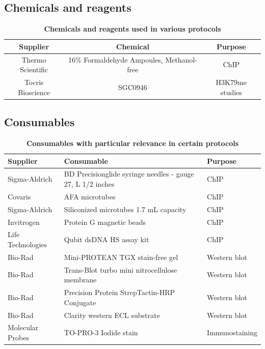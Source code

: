 \documentclass[11pt,twoside,a4paper]{report}
\begin{document}
		\subsection{Chemicals and reagents}
		
			\begin{table}[H]
       		\caption{\bf{Chemicals and reagents used in various protocols}}
        		\begin{center}
            		\begin{tabular}{c|c|c}
	               		Supplier & Chemical & Purpose\\
    		            \hline
    		            Thermo Scientific & 16\% Formaldehyde Ampoules, Methanol-free & ChIP\\
    		            Tocris Bioscience & SGC0946 & H3K79me studies\\
	            	\end{tabular}
    		    \end{center}
		    \end{table}
    
	    \subsection{Consumables}
	    \label{subsection:consumables}
			\begin{table}[H]
       			\caption{\bf{Consumables with particular relevance in certain protocols}}
        		\begin{center}
            		\begin{tabular}{p{2.9cm} | p{8.2cm} | p{2.2cm}}
	                	\textbf{Supplier} & \textbf{Consumable} &  \textbf{Purpose}\\
    		            \hline
    		            Sigma-Aldrich & BD Precisionglide syringe needles - gauge 27, L 1/2 inches & ChIP\\
    		            Covaris & AFA microtubes & ChIP\\
						Sigma-Aldrich & Siliconized microtubes 1.7 mL capacity & ChIP\\
        		        Invitrogen & Protein G magnetic beads & ChIP\\
        		        Life Technologies & Qubit dsDNA HS assay kit & ChIP\\
        		        Bio-Rad & Mini-PROTEAN TGX stain-free gel & Western blot\\
        		        Bio-Rad & Trans-Blot turbo mini nitrocellulose membrane & Western blot\\
						Bio-Rad & Precision Protein StrepTactin-HRP Conjugate & Western blot\\
        		        Bio-Rad & Clarity western ECL substrate & Western blot\\
        		        Molecular Probes & TO-PRO-3 Iodide stain & Immunostaining\\
	            	\end{tabular}
    		    \end{center}
		    \end{table}
    
\end{document}
